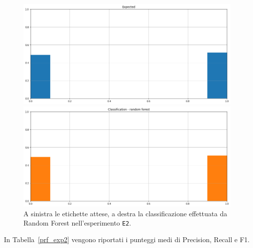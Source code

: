 \documentclass[12pt]{report}
\theoremstyle{definition}
\begin{document}
\begin{figure}
\centering
    \begin{minipage}{0.48\textwidth}
        \includegraphics[width=\linewidth]{images/experiment_beta5_disgiunti/expected_classification.png}
    \end{minipage}
    \begin{minipage}{0.48\textwidth}
        \includegraphics[width=\linewidth]{images/experiment_beta5_disgiunti/prediction_classification_rf.png}
    \end{minipage}
    \caption{A sinistra le etichette attese, a destra la classificazione effettuata da Random Forest nell'esperimento \texttt{E2}.}
    \label{rf_class_exp2}
\end{figure} 
In Tabella~\ref{prf_exp2} vengono riportati i punteggi medi di Precision, Recall e F1.
\end{document}
